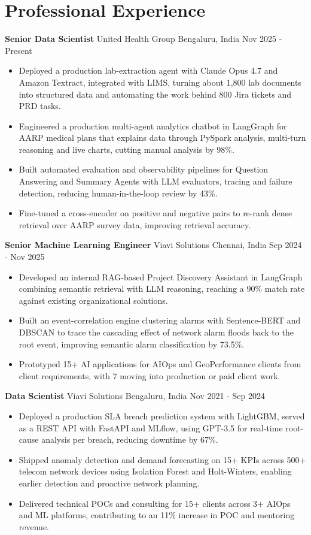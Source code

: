 \documentclass[10pt,a4paper]{article}
\newcommand{\role}[4]{\textbf{#1} \textbar{} #2 \hfill #3 \textbar{} #4\par}
\begin{document}
\section{Professional Experience}
\role{Senior Data Scientist}{United Health Group}{Bengaluru, India}{Nov 2025 - Present}
\begin{itemize}
  \item Deployed a production lab-extraction agent with Claude Opus 4.7 and Amazon Textract, integrated with LIMS, turning about 1,800 lab documents into structured data and automating the work behind 800 Jira tickets and PRD tasks.
  \item Engineered a production multi-agent analytics chatbot in LangGraph for AARP medical plans that explains data through PySpark analysis, multi-turn reasoning and live charts, cutting manual analysis by 98\%.
  \item Built automated evaluation and observability pipelines for Question Answering and Summary Agents with LLM evaluators, tracing and failure detection, reducing human-in-the-loop review by 43\%.
  \item Fine-tuned a cross-encoder on positive and negative pairs to re-rank dense retrieval over AARP survey data, improving retrieval accuracy.
\end{itemize}
\vspace{3pt}
\role{Senior Machine Learning Engineer}{Viavi Solutions}{Chennai, India}{Sep 2024 - Nov 2025}
\begin{itemize}
  \item Developed an internal RAG-based Project Discovery Assistant in LangGraph combining semantic retrieval with LLM reasoning, reaching a 90\% match rate against existing organizational solutions.
  \item Built an event-correlation engine clustering alarms with Sentence-BERT and DBSCAN to trace the cascading effect of network alarm floods back to the root event, improving semantic alarm classification by 73.5\%.
  \item Prototyped 15+ AI applications for AIOps and GeoPerformance clients from client requirements, with 7 moving into production or paid client work.
\end{itemize}
\vspace{3pt}
\role{Data Scientist}{Viavi Solutions}{Bengaluru, India}{Nov 2021 - Sep 2024}
\begin{itemize}
  \item Deployed a production SLA breach prediction system with LightGBM, served as a REST API with FastAPI and MLflow, using GPT-3.5 for real-time root-cause analysis per breach, reducing downtime by 67\%.
  \item Shipped anomaly detection and demand forecasting on 15+ KPIs across 500+ telecom network devices using Isolation Forest and Holt-Winters, enabling earlier detection and proactive network planning.
  \item Delivered technical POCs and consulting for 15+ clients across 3+ AIOps and ML platforms, contributing to an 11\% increase in POC and mentoring revenue.
\end{itemize}
\end{document}

